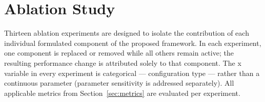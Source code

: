\documentclass[12pt, a4paper]{report}
\begin{document}
{{%

\section{Ablation Study}
\label{sec:ablation}

Thirteen ablation experiments are designed to isolate the
contribution of each individual formulated component of the
proposed framework. In each experiment, one component is
replaced or removed while all others remain active; the
resulting performance change is attributed solely to that
component. The x variable in every experiment is categorical
— configuration type — rather than a continuous parameter
(parameter sensitivity is addressed separately). All
applicable metrics from Section~\ref{sec:metrics} are
evaluated per experiment.

}}
\end{document}
